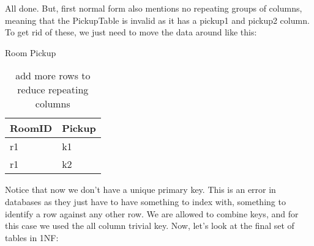 All done. But, first normal form also mentions no repeating groups of columns,
meaning that the PickupTable is invalid as it has a pickup1 and pickup2 column.
To get rid of these, we just need to move the data around like this:

\begin{table}[h]\footnotesize
Room Pickup \\
\begin{tabular}{ll}
\bf{RoomID}&\bf{Pickup} \\
\hline
r1&k1 \\
r1&k2 \\
\end{tabular}
\caption{add more rows to reduce repeating columns}
\end{table}

Notice that now we don't have a unique primary key. This is an error in
databases as they just have to have something to index with, something to
identify a row against any other row. We are allowed to combine keys, and for
this case we used the all column trivial key. Now, let's look at the final
set of tables in 1NF:

